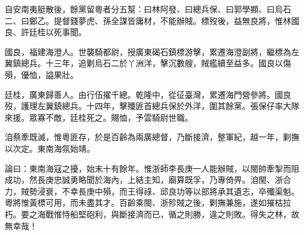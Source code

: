 \begin{pinyinscope}
自安南夷艇散後，餘黨留粵者分五幫：曰林阿發、曰總兵保、曰郭學顯、曰烏石二、曰鄭乙。提督錢夢虎、孫全謀皆庸材，不能辦賊。標歿後，益無良將，惟林國良、許廷桂以死事聞。

國良，福建海澄人。世襲騎都尉，授廣東碣石鎮標游擊，累遷海澄副將，繼標為左翼鎮總兵。十三年，追剿烏石二於丫洲洋，擊沉數艘，賊艦續至益多。國良以傷殞，優恤，謚果壯。

廷桂，廣東歸善人。由行伍擢千總。乾隆中，從征臺灣，累遷海門營參將。國良歿，護理左翼鎮總兵。十四年，擊殲匪首總兵保於外洋，圍其餘黨。張保仔率大隊來援。眾寡不敵，廷桂死之。賜恤，予雲騎尉世職。

洎蔡牽既滅，惟粵匪存，於是百齡為兩廣總督，乃斷接濟，整軍紀，越一年，剿撫以次定。東南海氛始靖。

論曰：東南海寇之擾，始末十有餘年。惟浙師李長庚一人能辦賊，以閩帥牽掣而阻成功，然長庚忠誠勇略聞於海內，上結主知，廟算既孚，乃專倚畀。洎閩、浙合力，賊勢浸衰，不幸長庚中殞，而王得祿、邱良功等以部將承其遺志，卒殲渠魁。粵將惟黃標可用，而未盡其才。百齡乘閩、浙殄賊之後，剿撫兼施，遂如摧枯拉朽。要之海戰惟恃船堅砲利，與斷接濟而已，循之則勝，違之則敗。得失之林，故無幸哉！


\end{pinyinscope}